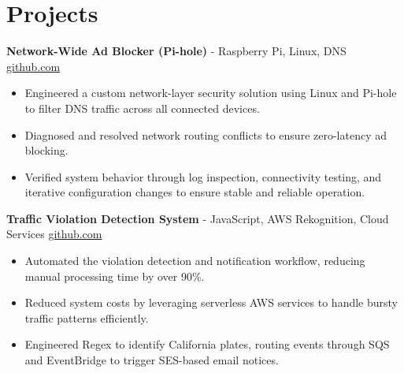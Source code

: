 \documentclass[11pt]{article}       %
\begin{document}

\vspace{-18.5pt}

\section*{Projects}

\textbf{Network-Wide Ad Blocker (Pi-hole)}{ - Raspberry Pi, Linux, DNS} \hfill \href{https://github.com/Monica20030707}{github.com} \\
\vspace{-9pt}
\begin{itemize}
  \item Engineered a custom network-layer security solution using Linux and Pi-hole to filter DNS traffic across all connected devices.
  \item Diagnosed and resolved network routing conflicts to ensure zero-latency ad blocking.
  \item Verified system behavior through log inspection, connectivity testing, and iterative configuration changes to ensure stable and reliable operation.
\end{itemize}

\textbf{Traffic Violation Detection System}{ - JavaScript, AWS Rekognition, Cloud Services} \hfill \href{https://github.com/Monica20030707/AWS_rekonigition-N-read-database}{github.com} \\
\vspace{-9pt}
\begin{itemize}
  \item Automated the violation detection and notification workflow, reducing manual processing time by over 90\%.
  \item Reduced system costs by leveraging serverless AWS services to handle bursty traffic patterns efficiently.
  \item Engineered Regex to identify California plates, routing events through SQS and EventBridge to trigger SES-based email notices.
\end{itemize}
\end{document}
